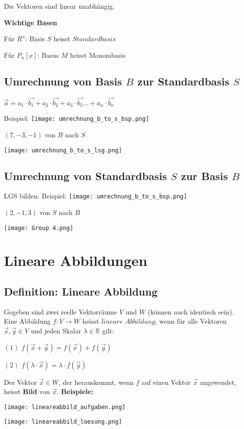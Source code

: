 \begin{multicols*}{3}
    { Die Vektoren sind linear unabhängig.}

    {\textbf{Wichtige Basen}}

    {Für $R^n$: Basis $S$ heisst $Standardbasis$ }

    {Für $P_n[x]$: Basus $M$ heisst Monombasis}
    \WhiteSpace
    \subsection{Umrechnung von Basis $B$ zur Standardbasis $S$}
    {$\vec{a} = a_1 \cdot \vec{b_1} + a_2 \cdot \vec{b_2} + a_3 \cdot \vec{b_3} ... + a_n \cdot \vec{b_n}$}

    {Beispiel:}
    {\texttt{[image: umrechnung\_b\_to\_s\_bsp.png]}}

    {$(7,-3,-1)$ von $B$ nach $S$}

    {\texttt{[image: umrechnung\_b\_to\_s\_lsg.png]}}
    \subsection{Umrechnung von Standardbasis $S$ zur Basis $B$}
    {LGS bilden:}
    {Beispiel:}
    {\texttt{[image: umrechnung\_b\_to\_s\_bsp.png]}}

    {$(2,-1,3)$ von $S$ nach $B$}

    {\texttt{[image: Group 4.png]}}
    \vfill\null
    \columnbreak
    \section{Lineare Abbildungen}
    \subsection{Definition: Lineare Abbildung}
    { Gegeben sind zwei reelle Vektorräume $V$ und $W$ (können auch identisch sein).}
    {Eine Abbildung $f:V \rightarrow W$ heisst $lineare$ $Abbildung$, wenn für alle Vektoren $\vec{x},\vec{y} \in  V$ und jeden Skalar $\lambda \in \mathbb{R} $ gilt:}

    {$(1)$ $f(\vec{x}+\vec{y})=f(\vec{x}) + f(\vec{y})$}

    {$(2)$ $f(\lambda \cdot \vec{x})=\lambda \cdot f(\vec{y})$}
    \WhiteSpace

    {Der Vektor $\vec{x} \in W$, der herauskommt, wenn $f$ auf einen Vektor $\vec{x}$ angewendet, heisst \textbf{Bild} von $\vec{x}$.}
    \WhiteSpace
    {\textbf{Beispiele:}}

    {\texttt{[image: lineareabbild\_aufgaben.png]}}

    {\texttt{[image: lineareabbild\_loesung.png]}}

\end{multicols*}





